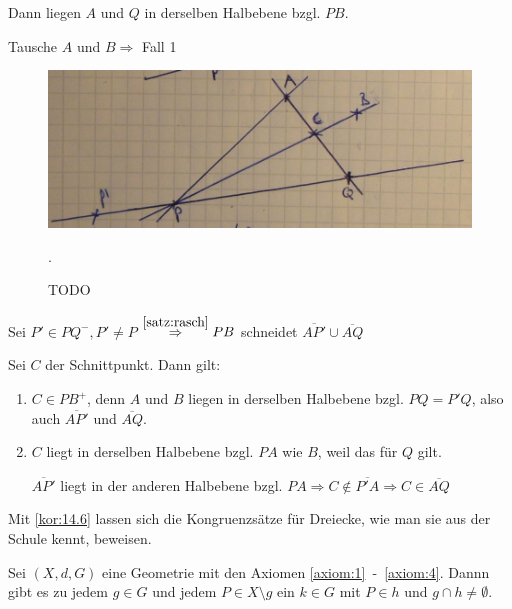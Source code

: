 \begin{beweis}
\begin{beweis}
\begin{beweis}
            Dann liegen $A$ und $Q$ in derselben Halbebene bzgl. $PB$.

            Tausche $A$ und $B \Rightarrow$  Fall 1
        \end{beweis}

        \begin{beweis}[Beweis 3]
            \begin{figure}
                \centering
                \includegraphics[width=0.5\linewidth, keepaspectratio]{figures/todo/bild-5.jpg}
                \caption{TODO}.
                \label{fig:bild-5}
            \end{figure}

            Sei $P' \in PQ^-, P' \neq P$
            $\stackrel{\cref{satz:rasch}}{\Rightarrow} PB$ schneidet
            $\overline{AP'} \cup \overline{AQ}$

            Sei $C$ der Schnittpunkt. Dann gilt:
            \begin{enumerate}[label=(\roman*)]
                \item $C \in PB^+$, denn $A$ und $B$ liegen in derselben
                      Halbebene bzgl. $PQ = P'Q$, also auch
                      $\overline{AP'}$ und $\overline{AQ}$.
                \item $C$ liegt in derselben Halbebene bzgl. $PA$ wie
                      $B$, weil das für $Q$ gilt.

                      $\overline{AP'}$ liegt in der anderen Halbebene
                      bzgl. $PA \Rightarrow C \notin \overline{P'A} \Rightarrow C \in \overline{AQ}$
            \end{enumerate}
        \end{beweis}
    \end{beweis}
\end{beweis}

\begin{bemerkung}
    Mit \ref{kor:14.6} lassen sich die Kongruenzsätze für Dreiecke,
    wie man sie aus der Schule kennt, beweisen.
\end{bemerkung}

\begin{proposition}%
    Sei $(X, d, G)$ eine Geometrie mit den Axiomen \ref{axiom:1}~-~\ref{axiom:4}.
    Dannn gibt es zu jedem $g \in G$ und jedem $P \in X \setminus g$ ein
    $k \in G$ mit $P \in h$ und $g \cap h \neq \emptyset$.
\end{proposition}

